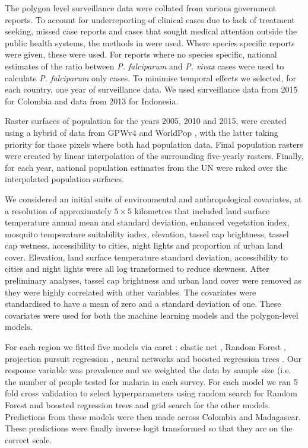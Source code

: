 \documentclass[11pt]{article}
\begin{document}
The polygon level surveillance data were collated from various government reports. To account for underreporting of clinical cases due to lack of treatment seeking, missed case reports and cases that sought medical attention outside the public health systems, the methods in \cite{cibulskis2011worldwide} were used. Where species specific reports were given, these were used. For reports where no species specific, national estimates of the ratio between \emph{P. falciparum} and \emph{P. vivax} cases were used to calculate \emph{P. falciparum} only cases. To minimise temporal effects we selected, for each country, one year of surveillance data. 
We used surveillance data from 2015 for Colombia and data from 2013 for Indonesia.

Raster surfaces of population for the years 2005, 2010 and 2015, were created using a hybrid of data from GPWv4 \cite{gpw4} and WorldPop \cite{tatem2017worldpop}, with the latter taking priority for those pixels where both had population data. 
Final population rasters were created by linear interpolation of the surrounding five-yearly rasters. 
Finally, for each year, national population estimates from the UN were raked over the interpolated population surfaces. 

We considered an initial suite of environmental and anthropological covariates, at a resolution of approximately $5 \times 5$ kilometres that included land surface temperature annual mean and standard deviation, enhanced vegetation index, mosquito temperature suitability index, elevation, tassel cap brightness, tassel cap wetness, accessibility to cities, night lights and proportion of urban land cover. 
Elevation, land surface temperature standard deviation, accessibility to cities and night lights were all log transformed to reduce skewness. 
After preliminary analyses, tassel cap brightness and urban land cover were removed as they were highly correlated with other variables. 
The covariates were standardised to have a mean of zero and a standard deviation of one. 
These covariates were used for both the machine learning models and the polygon-level models.

For each region we fitted five models via caret \cite{caret}: elastic net \cite{enet}, Random Forest \cite{ranger}, projection pursuit regression \cite{PPR}, neural networks \cite{nnet} and boosted regression trees \cite{gbm}.
Our response variable was prevalence and we weighted the data by sample size (i.e. the number of people tested for malaria in each survey.
For each model we ran 5 fold cross validation to select hyperparameters using random search for Random Forest and boosted regression trees and grid search for the other models. 
Predictions from these models were then made across Colombia and Madagascar.
These predictions were finally inverse logit transformed so that they are on the correct scale.
\end{document}
